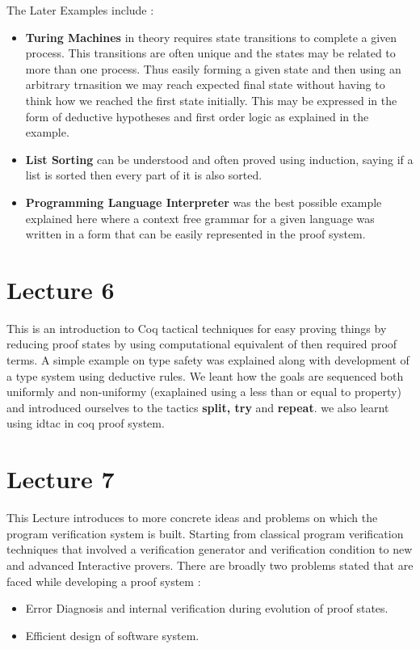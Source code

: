 \documentclass[paper=a4, fontsize=11pt]{scrartcl}
\numberwithin{equation}{section}		%
\numberwithin{figure}{section}			%
\numberwithin{table}{section}				%
\begin{document}
The Later Examples include :

\begin{itemize}
	\item{ \textbf{Turing Machines} in theory requires state transitions to complete a given process. This transitions are often unique and the states may be related to more than one process. Thus easily forming a given state and then using an arbitrary trnasition we may reach expected final state without having to think how we reached the first state initially. This may be expressed in the form of deductive hypotheses and first order logic as explained in the example.
	} 
	\item{\textbf{List Sorting} can be understood and often proved using induction, saying if a list is sorted then every part of it is also sorted.
	}
	\item{\textbf{Programming Language Interpreter} was the best possible example explained here where a context free grammar for a given language was written in a form that can be easily represented in the proof system.
	}
\end{itemize}

\section{Lecture 6}
This is an introduction to Coq tactical techniques for easy proving things by reducing proof states by using computational equivalent of then required proof terms. A simple example on type safety was explained along with development of a type system using deductive rules. We leant how the goals are sequenced both uniformly and non-uniformy (exaplained using a less than or equal to property) and introduced ourselves to the tactics \textbf{split, try}  and \textbf{repeat}. we also learnt using idtac in coq proof system.

\section{Lecture 7}
This Lecture introduces to more concrete ideas and problems on which the program verification system is built. Starting from classical program verification techniques that involved a verification generator and verification condition to new and advanced Interactive provers. There are broadly two problems stated that are faced while developing a proof system :

\begin{itemize}
	\item{Error Diagnosis and internal verification during evolution of proof states.}
	\item{Efficient design of software system.}
\end{itemize}
\end{document}
